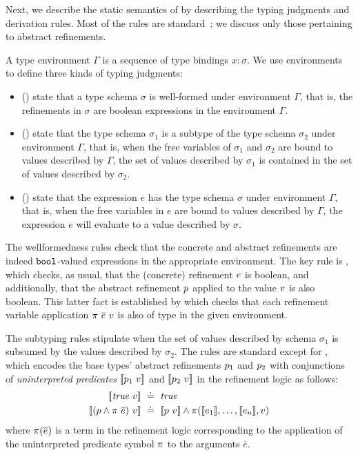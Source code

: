 

Next, we describe the static semantics of \corelan by describing the typing
judgments and derivation rules. Most of the rules are 
standard~\cite{Ou2004,LiquidPLDI08,Knowles10,GordonTOPLAS2011}; we 
discuss only those pertaining to abstract refinements.

A type environment $\Gamma$ is a sequence of type bindings $x:\sigma$.
We use environments to define three kinds of typing judgments:

\begin{itemize}
\item{ (\isWellFormed{\Gamma}{\sigma})} 
state that a type schema $\sigma$ is well-formed under environment
$\Gamma$, that is, the refinements in $\sigma$ are boolean 
expressions in the environment $\Gamma$.

\item{ ()} 
state that the type schema $\sigma_1$ is a subtype of the type schema
$\sigma_2$ under environment $\Gamma$, that is, when the free variables
of $\sigma_1$ and $\sigma_2$
are bound to values described by $\Gamma$, the set of values described
by $\sigma_1$ is contained in the set of values described by $\sigma_2$. 

\item{ ()} state that
the expression $e$ has the type schema $\sigma$ under environment $\Gamma$,
that is, when the free variables in $e$ are bound to values described by 
$\Gamma$, the expression $e$ will evaluate to a value described by $\sigma$.
\end{itemize}

The wellformedness rules check that the concrete and abstract
refinements are indeed $\texttt{bool}$-valued expressions in the 
appropriate environment.
The key rule is \wtBase, which checks, as usual, that the (concrete) 
refinement $e$ is boolean, and additionally, that the abstract
refinement $p$ applied to the value $v$ is also boolean.
This latter fact is established by \wtRVApp which checks that 
each refinement variable application ${\pi \ \overline{e}}\ v$ 
is also of type \tbbool in the given environment.

The subtyping rules stipulate when the set of values described 
by schema $\sigma_1$ is subsumed by the values described by $\sigma_2$.
The rules are standard except for \tsubVar, which encodes the base types' 
abstract refinements $p_1$ and $p_2$ with conjunctions of 
\emph{uninterpreted predicates} 
$[\![p_1\ v]\!]$ and $[\![p_2\ v]\!]$ in the 
refinement logic as follows:
\begin{align*}
\inter{\true\ \vref} & \defeq \true\\
\inter{(\areft \land \rvapp{\rvar}{e})\ \vref} & \defeq \inter{\areft\
\vref} \land \rvar(\inter{e_1},\ldots,\inter{e_n},\vref)
\end{align*}
where $\pi(\overline{e})$ is a term in the refinement logic corresponding
to the application of the uninterpreted predicate symbol $\pi$ to the 
arguments $\overline{e}$.

